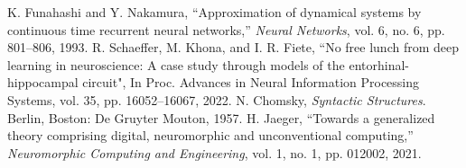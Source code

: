 \documentclass[conference]{IEEEtran}
\begin{document}
\begin{thebibliography}{00}
 K. Funahashi and Y. Nakamura, ``Approximation of dynamical systems by continuous time recurrent neural networks,'' \textit{Neural Networks}, vol. 6, no. 6, pp. 801--806, 1993.
 R. Schaeffer, M. Khona, and I. R. Fiete, ``No free lunch from deep learning in neuroscience: A case study through models of the entorhinal-hippocampal circuit", In Proc. Advances in Neural Information Processing Systems, vol. 35, pp. 16052--16067, 2022.
 N. Chomsky, \textit{Syntactic Structures}. Berlin, Boston: De Gruyter Mouton, 1957.
 H. Jaeger, ``Towards a generalized theory comprising digital, neuromorphic and unconventional computing,'' \textit{Neuromorphic Computing and Engineering}, vol. 1, no. 1, pp. 012002, 2021.
\end{thebibliography}
\vspace{12pt}
\end{document}
